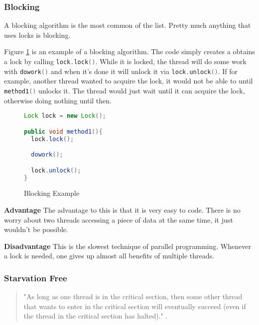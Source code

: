 \documentclass[letterpaper, 11pt]{article}
\newcommand{\inlinecode}[1]{\colorbox{codegrey}{\lstinline[language=C++]{#1}}}
\begin{document}
\subsubsection{Blocking}
A blocking algorithm is the most common of the list. Pretty much anything that uses locks is 
blocking. 
\par\vspace{\baselineskip}

Figure \ref{code:block_ex} is an example of a blocking algorithm.
The code simply creates a obtains a lock by calling \inlinecode{lock.lock()}. While it is locked, 
the thread will do some work with \inlinecode{dowork()} and when it's done it will unlock it via 
\inlinecode{lock.unlock()}. If for example, another thread wanted to acquire the lock, it would not be 
able to until \inlinecode{method1()} unlocks it. The thread would just wait until it can acquire the 
lock, otherwise doing nothing until then.
\par\vspace{\baselineskip}

\begin{figure}[H]
\begin{lstlisting}[language=Java]
Lock lock = new Lock();

public void method1(){
  lock.lock();

  dowork();

  lock.unlock();
}
\end{lstlisting}
\caption{Blocking Example}
\label{code:block_ex}
\end{figure}	


{\bfseries Advantage}\newline
The advantage to this is that it is very easy to code. There is no worry about two threads 
accessing a piece of data at the same time, it just wouldn't be possible.
\par\vspace{\baselineskip}

{\bfseries Disadvantage}\newline
This is the slowest technique of parallel programming. Whenever a lock is needed, one gives up 
almost all benefits of multiple threads.

\newpage
\subsubsection{Starvation Free}

\begin{quotation}
"As long as one thread is in the critical section, then some other thread that wants 
to enter in the critical section will eventually succeed (even if the thread in the 
critical section has halted)." \citep{artofmulti}.
\end{quotation}
\end{document}
